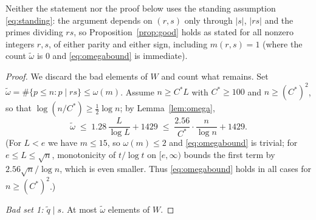 \documentclass[11pt]{amsart}
\numberwithin{equation}{section}
\theoremstyle{remark}
\begin{document}
Neither the statement nor the proof below uses the standing assumption
\eqref{eq:standing}: the argument depends on $(r,s)$ only through $|s|$, $|rs|$ and
the primes dividing $rs$, so Proposition~\ref{prop:good} holds as stated for all
nonzero integers $r,s$, of either parity and either sign, including
$m(r,s)=1$ (where the count $\tilde\omega$ is $0$ and \eqref{eq:omegabound} is
immediate).

\begin{proof}
We discard the bad elements of $W$ and count what remains. Set
$\tilde\omega=\#\{p\le n: p\mid rs\}\le\omega(m)$. Assume $n\ge C^*L$ with
$C^*\ge 100$ and $n\ge (C^*)^2$, so that $\log(n/C^*)\ge\tfrac12\log n$; by
Lemma~\ref{lem:omega},
\begin{equation}\label{eq:omegabound}
\tilde\omega\;\le\;1.28\,\frac{L}{\log L}+1429
\;\le\;\frac{2.56}{C^*}\cdot\frac{n}{\log n}+1429 .
\end{equation}
(For $L<e$ we have $m\le 15$, so $\omega(m)\le2$ and \eqref{eq:omegabound} is
trivial; for $e\le L\le\sqrt n$, monotonicity of $t/\log t$ on $[e,\infty)$
bounds the first term by $2.56\sqrt n/\log n$, which is even smaller. Thus
\eqref{eq:omegabound} holds in all cases for $n\ge (C^*)^2$.)

\emph{Bad set 1: $\tilde q\mid s$.} At most $\tilde\omega$ elements of $W$.


\end{proof}
\end{document}
